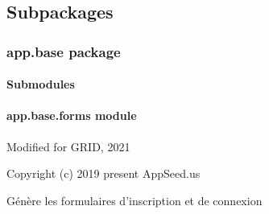 \documentclass[letterpaper,10pt,french]{sphinxmanual}
\begin{document}
\subsection{Subpackages}
\label{\detokenize{app:subpackages}}

\subsubsection{app.base package}
\label{\detokenize{app.base:app-base-package}}\label{\detokenize{app.base::doc}}

\paragraph{Submodules}
\label{\detokenize{app.base:submodules}}

\paragraph{app.base.forms module}
\label{\detokenize{app.base:module-app.base.forms}}\label{\detokenize{app.base:app-base-forms-module}}
\sphinxAtStartPar
Modified for GRID, 2021

\sphinxAtStartPar
Copyright (c) 2019 \sphinxhyphen{} present AppSeed.us

\sphinxAtStartPar
Génère les formulaires d’inscription et de connexion
\end{document}
